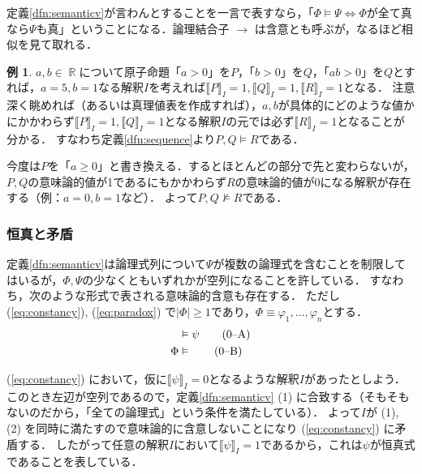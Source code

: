 \documentclass[uplatex,a4paper,dvipdfmx]{jsarticle}
\DeclareMathOperator{\Real}{\mathbb{R}}
\newcommand{\semvalue}[1]{\llbracket {#1} \rrbracket}
\theoremstyle{definition}
\newtheorem{example}{例}
\begin{document}
            定義\ref{dfn:semanticv}が言わんとすることを一言で表すなら，「$\Phi \vDash \Psi \Longleftrightarrow \Phi$が全て真なら$\Psi$も真」ということになる．論理結合子 $\to$ は含意とも呼ぶが，なるほど相似を見て取れる．

            \begin{example}
                $a, b \in \Real$について原子命題「$a > 0$」を$P$，「$b > 0$」を$Q$，「$ab > 0$」を$Q$とすれば，$a = 5, b = 1$なる解釈$I$を考えれば$\semvalue{P}_I = 1, \semvalue{Q}_I = 1, \semvalue{R}_I = 1$となる．
                注意深く眺めれば（あるいは真理値表を作成すれば），$a, b$が具体的にどのような値かにかかわらず$\semvalue{P}_I = 1, \semvalue{Q}_I = 1$となる解釈$I$の元では必ず$\semvalue{R}_I = 1$となることが分かる．
                すなわち定義\ref{dfn:sequence}より$P, Q \vDash R$である．

                今度は$P$を「$a \ge 0$」と書き換える．するとほとんどの部分で先と変わらないが，$P, Q$の意味論的値が1であるにもかかわらず$R$の意味論的値が0になる解釈が存在する（例：$a = 0, b = 1$など）．
                よって$P, Q \not\vDash R$である．
            \end{example}

            \subsubsection{恒真と矛盾}
                定義\ref{dfn:semanticv}は論理式列について$\Psi$が複数の論理式を含むことを制限してはいるが，$\Phi, \Psi$の少なくともいずれかが空列になることを許している．
                すなわち，次のような形式で表される意味論的含意も存在する．
                ただし (\ref{eq:constancy}), (\ref{eq:paradox}) で$|\Phi| \ge 1$であり，$\Phi \equiv \varphi_1,\ldots, \varphi_n$とする．
                \begin{align}
                    &\vDash \psi \tag{\arabic{equation}--A} \label{eq:constancy}\\
                    \Phi &\vDash \tag{\arabic{equation}--B} \label{eq:paradox}
                \end{align}

                (\ref{eq:constancy}) において，仮に$\semvalue{\psi}_I = 0$となるような解釈$I$があったとしよう．
                このとき左辺が空列であるので，定義\ref{dfn:semanticv} (1) に合致する（そもそもないのだから，「全ての論理式」という条件を満たしている）．
                よって$I$が (1), (2) を同時に満たすので意味論的に含意しないことになり (\ref{eq:constancy}) に矛盾する．
                したがって任意の解釈$I$において$\semvalue{\psi}_I = 1$であるから，これは$\psi$が恒真式であることを表している．
\end{document}
